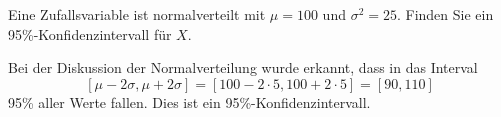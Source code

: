 Eine Zufallsvariable ist normalverteilt mit $\mu=100$ und $\sigma^2=25$.
Finden Sie ein 95\%-Konfidenzintervall für $X$.

\begin{loesung}
Bei der Diskussion der Normalverteilung wurde erkannt, dass in das
Interval
\[
[\mu - 2\sigma, \mu + 2\sigma]
=
[100-2\cdot 5, 100 + 2\cdot 5]
=
[90,110]
\]
95\% aller Werte fallen.
Dies ist ein 95\%-Konfidenzintervall.
\end{loesung}
